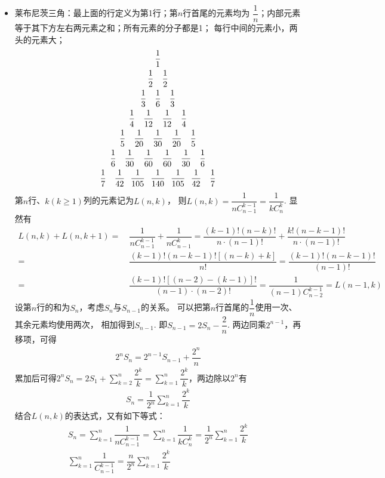 \begin{itemize}[leftmargin=\inteval{\myitemleftmargin}pt,itemsep=
   \inteval{\myitemitempsep}pt,topsep=\inteval{\myitemtopsep}pt]
\item 莱布尼茨三角：最上面的行定义为第1行；第$n$行首尾的元素均为
$\dfrac{1}{n}$；内部元素等于其下方左右两元素之和；所有元素的分子都是1；
每行中间的元素小，两头的元素大；
\begin{gather*}
    \dfrac{1}{1} \\
    \dfrac{1}{2}\q \dfrac{1}{2} \\
    \dfrac{1}{3}\q \dfrac{1}{6} \q \dfrac{1}{3} \\   
    \dfrac{1}{4}\q \dfrac{1}{12} \q \dfrac{1}{12} \q \dfrac{1}{4} \\
    \dfrac{1}{5}\q \dfrac{1}{20} \q \dfrac{1}{30} \q \dfrac{1}{20} \q
    \dfrac{1}{5} \\
    \dfrac{1}{6}\q \dfrac{1}{30} \q \dfrac{1}{60} \q \dfrac{1}{60} \q
    \dfrac{1}{30}\q \dfrac{1}{6} \\
    \dfrac{1}{7}\q \dfrac{1}{42} \ \ \dfrac{1}{105} \ \ \dfrac{1}{140} \ \ 
    \dfrac{1}{105}\ \ \dfrac{1}{42}  \q \dfrac{1}{7}
\end{gather*}
第$n$行、$k(k\geq 1)$列的元素记为$L(n,k)$，
则$L(n,k)=\dfrac{1}{nC_{n-1}^{k-1}}=\dfrac{1}{kC_n^k}$. 
显然有
\begin{align*}
    L(n,k)+L(n,k+1)=&\ \dfrac{1}{nC_{n-1}^{k-1}}+
    \dfrac{1}{nC_{n-1}^{k}}=\dfrac{(k-1)!(n-k)!}{n\cdot(n-1)!}+
    \dfrac{k!(n-k-1)!}{n\cdot(n-1)!} \\
    =&\ \dfrac{(k-1)!(n-k-1)![(n-k)+k]}{n!}
    = \dfrac{(k-1)!(n-k-1)!}{(n-1)!} \\
    =&\ \dfrac{(k-1)![(n-2)-(k-1)]!}{(n-1)\cdot (n-2)!}=
    \dfrac{1}{(n-1)C_{n-2}^{k-1}}=L(n-1,k)
\end{align*}
设第$n$行的和为$S_n$，考虑$S_n$与$S_{n-1}$的关系。
可以把第$n$行首尾的$\dfrac{1}{n}$使用一次、其余元素均使用两次，
相加得到$S_{n-1}$. 即$S_{n-1}=2S_{n}-\dfrac{2}{n}$. 
两边同乘$2^{n-1}$，再移项，可得
\begin{gather*}
    2^{n}S_{n}=2^{n-1}S_{n-1}+\dfrac{2^{n}}{n}
\end{gather*}
累加后可得$ 2^{n}S_{n}=2S_{1}+\sum\limits_{k=2}^{n} \dfrac{2^{k}}{k}=
\sum\limits_{k=1}^{n} \dfrac{2^{k}}{k} $，两边除以$2^n$有
\begin{gather*}
    S_n=\dfrac{1}{2^n}\sum_{k=1}^{n} \dfrac{2^{k}}{k}
\end{gather*}
结合$L(n,k)$的表达式，又有如下等式：
\begin{gather*}
    S_n=\sum_{k=1}^{n}\dfrac{1}{nC_{n-1}^{k-1}}
    =\sum_{k=1}^{n}\dfrac{1}{kC_n^k}
    =\dfrac{1}{2^n}\sum_{k=1}^{n} \dfrac{2^{k}}{k}  \\
    \sum_{k=1}^{n}\dfrac{1}{C_{n-1}^{k-1}}=
    \dfrac{n}{2^n}\sum_{k=1}^{n} \dfrac{2^{k}}{k}
\end{gather*}


\end{itemize}
